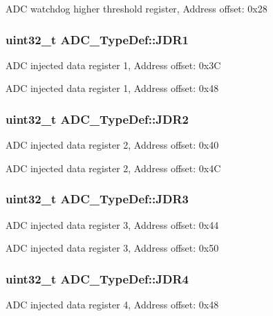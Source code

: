 A\-D\-C watchdog higher threshold register, Address offset\-: 0x28 \hypertarget{struct_a_d_c___type_def_ab4b0a79a9e4a9d5b0a24d7285cf55bdc}{
\subsubsection[{J\-D\-R1}]{ uint32\-\_\-t A\-D\-C\-\_\-\-Type\-Def\-::\-J\-D\-R1}}\label{struct_a_d_c___type_def_ab4b0a79a9e4a9d5b0a24d7285cf55bdc}
A\-D\-C injected data register 1, Address offset\-: 0x3\-C

A\-D\-C injected data register 1, Address offset\-: 0x48 \hypertarget{struct_a_d_c___type_def_a898b87cab4f099bcca981cc4c9318b51}{
\subsubsection[{J\-D\-R2}]{ uint32\-\_\-t A\-D\-C\-\_\-\-Type\-Def\-::\-J\-D\-R2}}\label{struct_a_d_c___type_def_a898b87cab4f099bcca981cc4c9318b51}
A\-D\-C injected data register 2, Address offset\-: 0x40

A\-D\-C injected data register 2, Address offset\-: 0x4\-C \hypertarget{struct_a_d_c___type_def_a40999cd0a255ef62b2340e2726695063}{
\subsubsection[{J\-D\-R3}]{ uint32\-\_\-t A\-D\-C\-\_\-\-Type\-Def\-::\-J\-D\-R3}}\label{struct_a_d_c___type_def_a40999cd0a255ef62b2340e2726695063}
A\-D\-C injected data register 3, Address offset\-: 0x44

A\-D\-C injected data register 3, Address offset\-: 0x50 \hypertarget{struct_a_d_c___type_def_abae6e9d688b16ef350878998f5e21c0b}{
\subsubsection[{J\-D\-R4}]{ uint32\-\_\-t A\-D\-C\-\_\-\-Type\-Def\-::\-J\-D\-R4}}\label{struct_a_d_c___type_def_abae6e9d688b16ef350878998f5e21c0b}
A\-D\-C injected data register 4, Address offset\-: 0x48

